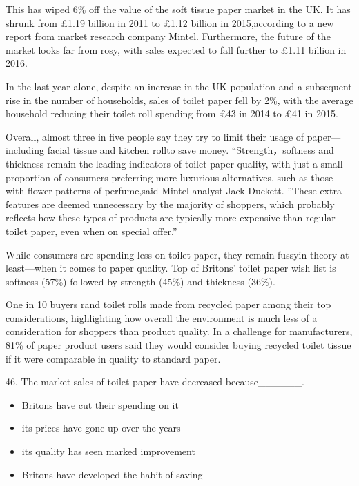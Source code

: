 \documentclass[UTF8,11pt]{ctexart}
\begin{document}
This has wiped 6\% off the value of the soft tissue paper market in the UK. It has shrunk from £1.19 billion in 2011 to £1.12 billion in 2015,according to a new report from market research company Mintel. Furthermore, the future of the market looks far from rosy, with sales expected to fall further to £1.11 billion in 2016.


In the last year alone, despite an increase in the UK population and a subsequent rise in the number of households, sales of toilet paper fell by 2\%, with the average household reducing their toilet roll spending from £43 in 2014 to £41 in 2015.


Overall, almost three in five people say they try to limit their usage of paper—including facial tissue and kitchen roll\textemdash{}to save money. “Strength，softness and thickness remain the leading indicators of toilet paper quality, with just a small proportion of consumers preferring more luxurious alternatives, such as those with flower patterns of perfume,said Mintel analyst Jack Duckett. ''These extra features are deemed unnecessary by the majority of shoppers, which probably reflects how these types of products are typically more expensive than regular toilet paper, even when on special offer.”


While consumers are spending less on toilet paper, they remain fussy\textemdash{}in theory at least—when it comes to paper quality. Top of Britons’ toilet paper wish list is softness (57\%) followed by strength (45\%) and thickness (36\%).


One in 10 buyers rand toilet rolls made from recycled paper among their top considerations, highlighting how overall the environment is much less of a consideration for shoppers than product quality. In a challenge for manufacturers, 81\% of paper product users said they would consider buying recycled toilet tissue if it were comparable in quality to standard paper.


46. The market sales of toilet paper have decreased because\_\_\_\_\_\_.


\begin{itemize}[leftmargin=2em,itemsep=.2em,topsep=.4em]\item[A.] Britons have cut their spending on it
\item[B.] its prices have gone up over the years
\item[C.] its quality has seen marked improvement
\item[D.] Britons have developed the habit of saving
\end{itemize}
\end{document}
